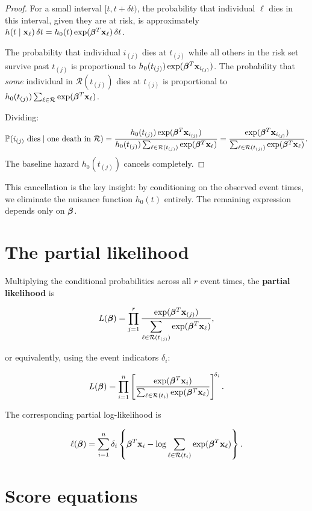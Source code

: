 \begin{proof}
For a small interval $[t, t + \delta t)$, the probability that individual $\ell$ dies in this interval, given they are at risk, is approximately $h(t \mid \mathbf{x}_\ell)\,\delta t = h_0(t)\exp(\boldsymbol{\beta}^T\mathbf{x}_\ell)\,\delta t$.

The probability that individual $i_{(j)}$ dies at $t_{(j)}$ while all others in the risk set survive past $t_{(j)}$ is proportional to $h_0(t_{(j)})\exp(\boldsymbol{\beta}^T\mathbf{x}_{i_{(j)}})$. The probability that \emph{some} individual in $\mathcal{R}(t_{(j)})$ dies at $t_{(j)}$ is proportional to $h_0(t_{(j)})\sum_{\ell \in \mathcal{R}} \exp(\boldsymbol{\beta}^T\mathbf{x}_\ell)$.

Dividing:
\[
\mathbb{P}(i_{(j)} \text{ dies} \mid \text{one death in } \mathcal{R})
= \frac{h_0(t_{(j)})\exp(\boldsymbol{\beta}^T\mathbf{x}_{i_{(j)}})}{h_0(t_{(j)})\sum_{\ell \in \mathcal{R}(t_{(j)})} \exp(\boldsymbol{\beta}^T\mathbf{x}_\ell)}
= \frac{\exp(\boldsymbol{\beta}^T\mathbf{x}_{i_{(j)}})}{\sum_{\ell \in \mathcal{R}(t_{(j)})} \exp(\boldsymbol{\beta}^T\mathbf{x}_\ell)}.
\]
The baseline hazard $h_0(t_{(j)})$ cancels completely.
\end{proof}

\begin{remark}
This cancellation is the key insight: by conditioning on the observed event times, we eliminate the nuisance function $h_0(t)$ entirely. The remaining expression depends only on $\boldsymbol{\beta}$.
\end{remark}

\section*{The partial likelihood}

Multiplying the conditional probabilities across all $r$ event times, the \textbf{partial likelihood} is

\[
L(\boldsymbol{\beta}) = \prod_{j=1}^r \frac{\exp(\boldsymbol{\beta}^T\mathbf{x}_{(j)})}{\displaystyle\sum_{\ell \in \mathcal{R}(t_{(j)})} \exp(\boldsymbol{\beta}^T\mathbf{x}_\ell)},
\]

or equivalently, using the event indicators $\delta_i$:

\[
L(\boldsymbol{\beta}) = \prod_{i=1}^n \left[\frac{\exp(\boldsymbol{\beta}^T\mathbf{x}_i)}{\sum_{\ell \in \mathcal{R}(t_i)} \exp(\boldsymbol{\beta}^T\mathbf{x}_\ell)}\right]^{\!\delta_i}.
\]

The corresponding partial log-likelihood is

\[
\ell(\boldsymbol{\beta}) = \sum_{i=1}^n \delta_i \left\{\boldsymbol{\beta}^T\mathbf{x}_i - \log \sum_{\ell \in \mathcal{R}(t_i)} \exp(\boldsymbol{\beta}^T\mathbf{x}_\ell)\right\}.
\]

\section*{Score equations}

